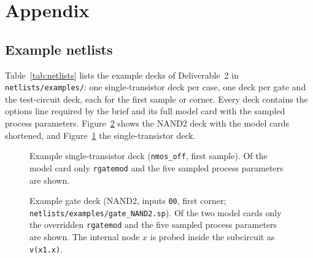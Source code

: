 \section{Appendix}\label{sec:appendix}

\subsection{Example netlists}\label{sec:appnetlists}
Table~\ref{tab:netlists} lists the example decks of Deliverable~2 in \texttt{netlists/examples/}:
one single-transistor deck per case, one deck per gate and the test-circuit deck, each for the
first sample or corner. Every deck contains the options line required by the brief and its full
model card with the sampled process parameters. Figure~\ref{fig:netlistnand} shows the NAND2 deck
with the model cards shortened, and Figure~\ref{fig:netlist} the single-transistor deck.

\begin{table}[H]
  \centering
  \small
  \caption{Example netlists (Deliverable~2), \texttt{netlists/examples/}.}
  \label{tab:netlists}
  \fittable{}
\end{table}

\begin{figure}[H]
  \centering
  \begin{minipage}{0.92\linewidth}
    \small
    
  \end{minipage}
  \caption{Example single-transistor deck (\texttt{nmos\_off}, first sample). Of the model card
  only \texttt{rgatemod} and the five sampled process parameters are shown.}
  \label{fig:netlist}
\end{figure}

\begin{figure}[H]
  \centering
  \begin{minipage}{0.92\linewidth}
    \small
    
  \end{minipage}
  \caption{Example gate deck (NAND2, inputs \texttt{00}, first corner;
  \texttt{netlists/examples/gate\_NAND2.sp}). Of the two model cards only the overridden
  \texttt{rgatemod} and the five sampled process parameters are shown. The internal node $x$ is
  probed inside the subcircuit as \texttt{v(x1.x)}.}
  \label{fig:netlistnand}
\end{figure}

